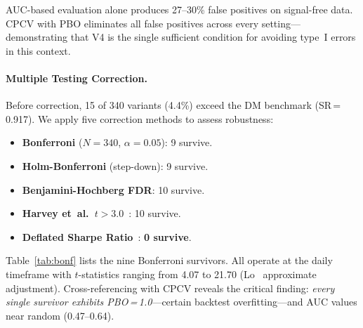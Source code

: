 \documentclass[sigconf,anonymous,review]{acmart}
\begin{document}
AUC-based evaluation alone produces 27--30\% false positives on
signal-free data. CPCV with PBO eliminates all false positives across
every setting---demonstrating that V4 is the single sufficient
condition for avoiding type~I errors in this context.

\paragraph{Multiple Testing Correction.}
Before correction, 15 of 340 variants (4.4\%) exceed the DM benchmark
(SR\,=\,0.917). We apply five correction methods to assess robustness:

\begin{itemize}
\item \textbf{Bonferroni} ($N=340$, $\alpha=0.05$): 9 survive.
\item \textbf{Holm-Bonferroni} (step-down): 9 survive.
\item \textbf{Benjamini-Hochberg FDR}: 10 survive.
\item \textbf{Harvey et~al.~$t>3.0$}~\cite{harvey2016cross}: 10 survive.
\item \textbf{Deflated Sharpe Ratio}~\cite{bailey2014deflated}: \textbf{0 survive}.
\end{itemize}

Table~\ref{tab:bonf} lists the nine Bonferroni survivors.
All operate at the daily timeframe with $t$-statistics ranging from
4.07 to 21.70 (Lo~\cite{lo2002statistics} approximate adjustment).
Cross-referencing with CPCV reveals the critical finding:
\emph{every single survivor exhibits PBO\,=\,1.0}---certain backtest
overfitting---and AUC values near random (0.47--0.64).
\end{document}
